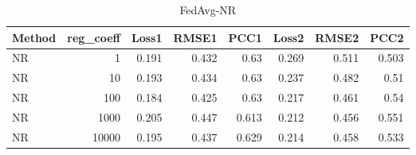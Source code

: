 \begin{table}
\caption{FedAvg-NR}
\begin{tabular}{lrrrrrrr}
\toprule
Method & reg_coeff & Loss1 & RMSE1 & PCC1 & Loss2 & RMSE2 & PCC2 \\
\midrule
NR & 1 & 0.191 & 0.432 & 0.63 & 0.269 & 0.511 & 0.503 \\
NR & 10 & 0.193 & 0.434 & 0.63 & 0.237 & 0.482 & 0.51 \\
NR & 100 & 0.184 & 0.425 & 0.63 & 0.217 & 0.461 & 0.54 \\
NR & 1000 & 0.205 & 0.447 & 0.613 & 0.212 & 0.456 & 0.551 \\
NR & 10000 & 0.195 & 0.437 & 0.629 & 0.214 & 0.458 & 0.533 \\
\bottomrule
\end{tabular}
\end{table}
